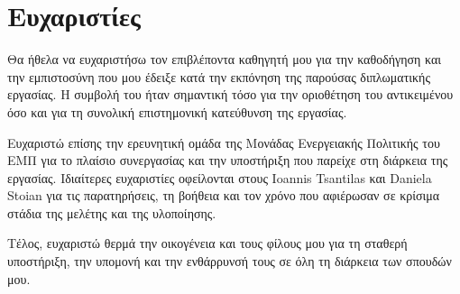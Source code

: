 \chapter*{Ευχαριστίες}

Θα ήθελα να ευχαριστήσω τον επιβλέποντα καθηγητή μου για την καθοδήγηση και
την εμπιστοσύνη που μου έδειξε κατά την εκπόνηση της παρούσας διπλωματικής
εργασίας. Η συμβολή του ήταν σημαντική τόσο για την οριοθέτηση του αντικειμένου
όσο και για τη συνολική επιστημονική κατεύθυνση της εργασίας.

Ευχαριστώ επίσης την ερευνητική ομάδα της Μονάδας Ενεργειακής Πολιτικής του
ΕΜΠ για το πλαίσιο συνεργασίας και την υποστήριξη που παρείχε στη διάρκεια της
εργασίας. Ιδιαίτερες ευχαριστίες οφείλονται στους Ioannis Tsantilas και Daniela
Stoian για τις παρατηρήσεις, τη βοήθεια και τον χρόνο που αφιέρωσαν σε κρίσιμα
στάδια της μελέτης και της υλοποίησης.

Τέλος, ευχαριστώ θερμά την οικογένεια και τους φίλους μου για τη σταθερή
υποστήριξη, την υπομονή και την ενθάρρυνσή τους σε όλη τη διάρκεια των σπουδών
μου.
\clearpage
